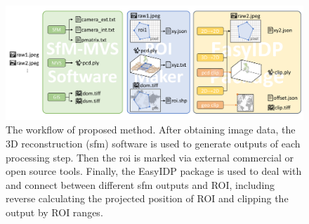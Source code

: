 \documentclass[doublespacing]{configs/bmcart}
\begin{document}
\begin{backmatter}




\begin{figure}[!htb]
  \includegraphics[width=0.95\linewidth]{figures/workflow.pdf}
  \caption{The workflow of proposed method. After obtaining image data, the 3D reconstruction (\acrshort*{sfm}) software is used to generate outputs of each processing step. Then the \acrfull*{roi} is marked via external commercial or open source tools. Finally, the EasyIDP package is used to deal with and connect between different \acrshort*{sfm} outputs and ROI, including reverse calculating the projected position of ROI and clipping the output by ROI ranges.}
  \label{fig:workflow}
\end{figure}


\end{backmatter}
\end{document}
